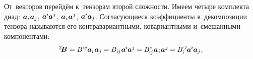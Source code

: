 \begin{otherlanguage}{russian}
От~векторов перейдём к~тензорам второй сложности.
Имеем четыре комплекта диад:
${\bm{a}_i \hspace{.1ex} \bm{a}_j}$,
\hbox{$\bm{a}^{\hspace{-0.05ex}i} \hspace{-0.1ex} \bm{a}^{\hspace{0.05ex}j}$\hspace{-0.25ex},}
\hbox{$\bm{a}_i \hspace{.1ex} \bm{a}^{\hspace{0.05ex}j}$\hspace{-0.25ex},}
${\bm{a}^{\hspace{-0.05ex}i} \hspace{-0.1ex} \bm{a}_j}$.
Согласующиеся коэффициенты в~декомпозиции тензора называются его контра\-вариант\-ными, ко\-вариант\-ными и~смешан\-ными компонентами:
\vspace{.1em}\begin{equation}\begin{array}{c}
{^2\!\bm{B}} \hspace{.1ex} =
B^{\hspace{.1ex}{i\hspace{-0.1ex}j}} \hspace{-0.1ex} \bm{a}_i \hspace{.1ex} \bm{a}_j \hspace{-0.05ex} =
B_{i\hspace{-0.1ex}j} \hspace{.1ex} \bm{a}^{\hspace{-0.05ex}i} \hspace{-0.1ex} \bm{a}^{\hspace{0.05ex}j} \hspace{-0.15ex} =
B_{\hspace{-0.2ex} \cdot j}^{\hspace{.1ex}i} \hspace{.1ex} \bm{a}_i \hspace{.1ex} \bm{a}^{\hspace{0.05ex}j} \hspace{-0.15ex} =
B_{\hspace{-0.1ex}i}^{\hspace{-0.05ex} \cdot j} \hspace{-0.2ex} \bm{a}^{\hspace{-0.05ex}i} \hspace{-0.1ex} \bm{a}_j \hspace{.1ex}, \\[0.4em]

\end{array}
\end{equation}
\end{otherlanguage}
